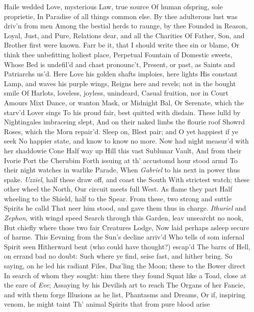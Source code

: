 \documentclass[11pt]{book}
\newcounter {first}
\begin{document}
Haile wedded Love, mysterious Law, true source 
Of human ofspring, sole proprietie, 
In Paradise of all things common else. 
By thee adulterous lust was driv'n from men 
Among the bestial herds to raunge, by thee 
Founded in Reason, Loyal, Just, and Pure, 
Relations dear, and all the Charities 
Of Father, Son, and Brother first were known. 
Farr be it, that I should write thee sin or blame, 
Or think thee unbefitting holiest place, 
Perpetual Fountain of Domestic sweets, 
Whose Bed is undefil'd and chast pronounc't, 
Present, or past, as Saints and Patriarchs us'd. 
Here Love his golden shafts imploies, here lights 
His constant Lamp, and waves his purple wings, 
Reigns here and revels; not in the bought smile 
Of Harlots, loveless, joyless, unindeard, 
Casual fruition, nor in Court Amours 
Mixt Dance, or wanton Mask, or Midnight Bal, 
Or Serenate, which the starv'd Lover sings 
To his proud fair, best quitted with disdain. 
These lulld by Nightingales imbraceing slept, 
And on their naked limbs the flourie roof 
Showrd Roses, which the Morn repair'd.  Sleep on, 
Blest pair; and O yet happiest if ye seek 
No happier state, and know to know no more. 
\quad Now had night measur'd with her shaddowie Cone 
Half way up Hill this vast Sublunar Vault, 
And from their Ivorie Port the Cherubim 
Forth issuing at th' accustomd hour stood armd 
To their night watches in warlike Parade, 
When \textit{Gabriel} to his next in power thus spake. 
\quad \textit{Uzziel}, half these draw off, and coast the South 
With strictest watch; these other wheel the North, 
Our circuit meets full West.  As flame they part 
Half wheeling to the Shield, half to the Spear. 
From these, two strong and suttle Spirits he calld 
That neer him stood, and gave them thus in charge. 
\quad \textit{Ithuriel} and \textit{Zephon}, with wingd speed 
Search through this Garden, leav unsearcht no nook, 
But chiefly where those two fair Creatures Lodge, 
Now laid perhaps asleep secure of harme. 
This Eevning from the Sun's decline arriv'd 
Who tells of som infernal Spirit seen 
Hitherward bent (who could have thought?) escap'd 
The barrs of Hell, on errand bad no doubt: 
Such where ye find, seise fast, and hither bring. 
\quad So saying, on he led his radiant Files, 
Daz'ling the Moon; these to the Bower direct 
In search of whom they sought: him there they found 
Squat like a Toad, close at the eare of \textit{Eve}; 
Assaying by his Devilish art to reach 
The Organs of her Fancie, and with them forge 
Illusions as he list, Phantasms and Dreams, 
Or if, inspiring venom, he might taint 
Th' animal Spirits that from pure blood arise 
\end{document}
